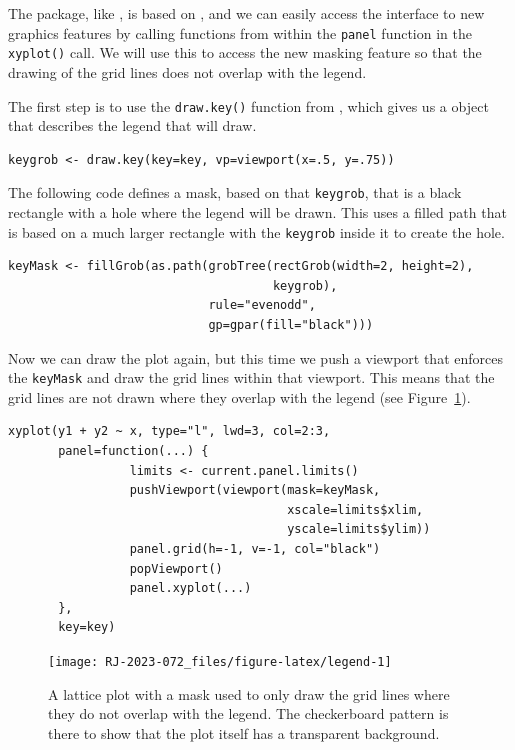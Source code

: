 The  package, like ,
is based on , and we can easily access the 
interface to new graphics features by calling  functions
from within the \texttt{panel} function in the \texttt{xyplot()} call.
We will use this to access the new masking feature so that the
drawing of the grid lines
does not overlap with the legend.

The first step is to use the \texttt{draw.key()} function from ,
which gives us a  object that describes the legend that 
will draw.

\begin{verbatim}
keygrob <- draw.key(key=key, vp=viewport(x=.5, y=.75))
\end{verbatim}

The following code defines a mask, based on that \texttt{keygrob},
that is a black rectangle with a hole
where the legend will be drawn. This uses a filled path that is
based on a much larger rectangle with the \texttt{keygrob} inside it to create
the hole.

\begin{verbatim}
keyMask <- fillGrob(as.path(grobTree(rectGrob(width=2, height=2),
                                     keygrob),
                            rule="evenodd",
                            gp=gpar(fill="black")))
\end{verbatim}

Now we can draw the  plot again, but this time we push
a  viewport that enforces the \texttt{keyMask} and draw
the grid lines within that viewport. This means that
the grid lines are not drawn where they overlap with the legend
(see Figure~\ref{fig:legend}).

\begin{verbatim}
xyplot(y1 + y2 ~ x, type="l", lwd=3, col=2:3,
       panel=function(...) { 
                 limits <- current.panel.limits()
                 pushViewport(viewport(mask=keyMask, 
                                       xscale=limits$xlim, 
                                       yscale=limits$ylim))
                 panel.grid(h=-1, v=-1, col="black")
                 popViewport()
                 panel.xyplot(...)
       },
       key=key)
\end{verbatim}

\begin{figure}[h]
\texttt{[image: RJ-2023-072\_files/figure-latex/legend-1]} \caption{A lattice plot with a mask used to only draw the grid lines where they do not overlap with the legend. The checkerboard pattern is there to show that the plot itself has a transparent background.}\label{fig:legend}
\end{figure}

